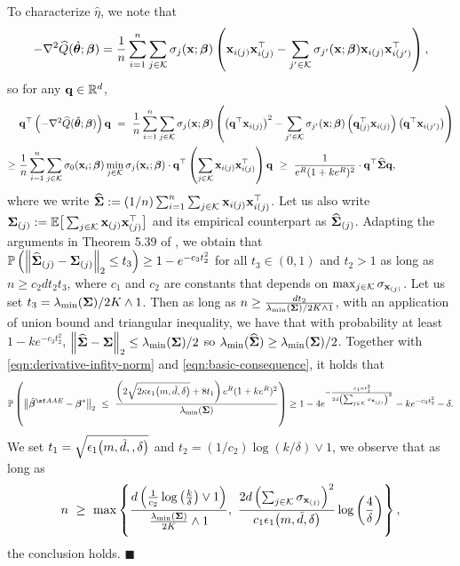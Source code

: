 {    To characterize $\hat{\eta}$, we note that $$-\nabla^2\widehat{Q}(\hat{\bm{\theta}};\bm{\beta}) = \frac{1}{n}\sum_{i=1}^n \sum_{j \in \mathcal{K}}\sigma_j(\mathbf{x}; \bm{\beta})\left(
    \mathbf{x}_{i(j)}\mathbf{x}^{\top}_{i(j)} - \sum_{j' \in \mathcal{K}}\sigma_{j'}(\mathbf{x}; \bm{\beta})\mathbf{x}_{i(j)}\mathbf{x}^{\top}_{i(j')} 
    \right),$$ so for any $\mathbf{q} \in \mathbb{R}^{d}$, 
    \begin{align*}
        &\mathbf{q}^{\top}\left(-\nabla^2\widehat{Q}(\hat{\bm{\theta}};\bm{\beta})\right)\mathbf{q}~=~ \frac{1}{n}\sum_{i=1}^n \sum_{j \in \mathcal{K}}\sigma_j(\mathbf{x}; \bm{\beta})\left(
    \left(\mathbf{q}^\top \mathbf{x}_{i(j)}\right)^2 - \sum_{j' \in \mathcal{K}}\sigma_{j'}(\mathbf{x}; \bm{\beta})\left(\mathbf{q}_{(j)}^\top \mathbf{x}_{i(j)}\right)\left(\mathbf{q}^\top \mathbf{x}_{i(j')}\right)
    \right)\\
    \geq~ &\frac{1}{n}\sum_{i=1}^n \sum_{j \in \mathcal{K}}\sigma_0(\mathbf{x}_i; \bm{\beta})\min_{j\in \mathcal{K}}\sigma_j(\mathbf{x}_i; \bm{\beta}) \cdot\mathbf{q}^{\top}\left(\sum_{j \in \mathcal{K}}\mathbf{x}_{i(j)}\mathbf{x}^{\top}_{i(j)}\right)\mathbf{q} ~\geq~ \frac{1}{e^R(1 + ke^R)^2}\cdot\mathbf{q}^{\top}\widehat{\bm{\Sigma}}\mathbf{q},
    \end{align*}
    where we write $\widehat{\bm{\Sigma}}:= (1/n)\sum_{i=1}^n\sum_{j \in \mathcal{K}}\mathbf{x}_{i(j)}\mathbf{x}^{\top}_{i(j)}$.
    Let us also  write $\bm{\Sigma}_{(j)} := \mathbb{E}\big[\sum_{j\in \mathcal{K}}\mathbf{x}_{(j)}\mathbf{x}_{(j)}^{\top}\big]$ and its empirical counterpart as $\widehat{\bm{\Sigma}}_{(j)}$. 
    Adapting the arguments in Theorem 5.39 of \cite{vershynin2010introduction}, we obtain that $\mathbb{P}\left(\left\lVert \widehat{\bm{\Sigma}}_{(j)} - {\bm{\Sigma}}_{(j)}\right\rVert_2 \leq t_3\right) \geq 1 - e^{-c_3 t_2^2}$ for all $t_3 \in (0,1)$ and $t_2 > 1$ as long as $n \geq c_2dt_2t_3$, where $c_1$ and $c_2$ are constants that depends on $\max_{j \in \mathcal{K}}\sigma_{\mathbf{x}_{(j)}}$. 
    Let us set $t_3 = \lambda_{\min}(\bm{\Sigma})/2K \wedge 1$. 
    Then as long as $n \geq
\frac{dt_2}{\lambda_{\min}(\bm{\Sigma})/2K \wedge 1}$, with an application of union bound and triangular inequality, we have that with probability at least $1 - ke^{-c_3t^2_2}$,  
$\left\lVert \widehat{\bm{\Sigma}}- {\bm{\Sigma}}\right\rVert_2 \leq \lambda_{\min}(\bm{\Sigma})/2$ so $\lambda_{\min}(\widehat{\bm{\Sigma}}) \geq \lambda_{\min}(\bm{\Sigma})/2$.
Together with \eqref{eqn:derivative-infity-norm} and \eqref{eqn:basic-consequence}, 
it holds that 
$$
\Prob
\left(
\big\lVert \hat{\betavec}^{\sf AAE} - {\betavec}^* \big\rVert_2 ~\leq~ \frac{
\left(2\sqrt{2\kappa\epsilon_1\big(m,\Tilde{d},\delta\big)} + 8t_1  
       \right)e^R(1 + ke^R)^2
}{\lambda_{\min}(\Sigmavec)}
\right)
\geq 1 - 4e^{-\frac{c_1n t_1^2}{2d\left(\sum_{j \in \Kscr}\sigma_{\x_{(j)}}\right)^2}} - ke^{-c_3t^2_2} - \delta.
$$
We set $t_1 = \sqrt{\epsilon_1\big(m,\Tilde{d}, ,\delta\big)}$ and $t_2 = (1/c_2)\log\left(k/\delta\right)\vee 1$, we observe that as long as 
$$n ~\geq~ 
\max\left\{
\frac{d
\left(
\frac{1}{c_2}\log\left(\frac{k}{\delta}\right) \vee 1\right)
}{\frac{\lambda_{\min}(\bm{\Sigma})}{2K}\wedge 1},~ \frac{2d\left(\sum_{j \in \mathcal{K}}\sigma_{\mathbf{x}_{(j)}}\right)^2}{c_1\epsilon_1\big(m,\Tilde{d},\delta\big)}\log\left(\frac{4}{\delta}\right)
    \right\},
$$
the conclusion holds.
\hfill $\blacksquare$}
\vspace{3mm}

